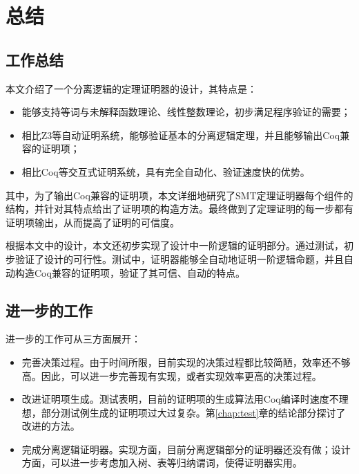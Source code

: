 \chapter{总结}
\label{chap:end}

\section{工作总结}
本文介绍了一个分离逻辑的定理证明器的设计，其特点是：
\begin{itemize}
  \item 能够支持等词与未解释函数理论、线性整数理论，初步满足程序验证的需要；
  \item 相比Z3等自动证明系统，能够验证基本的分离逻辑定理，并且能够输出Coq兼容的证明项；
  \item 相比Coq等交互式证明系统，具有完全自动化、验证速度快的优势。
\end{itemize}

其中，为了输出Coq兼容的证明项，本文详细地研究了SMT定理证明器每个组件的结构，并针对其特点给出了证明项的构造方法。最终做到了定理证明的每一步都有证明项输出，从而提高了证明的可信度。

根据本文中的设计，本文还初步实现了设计中一阶逻辑的证明部分。通过测试，初步验证了设计的可行性。测试中，证明器能够全自动地证明一阶逻辑命题，并且自动构造Coq兼容的证明项，验证了其可信、自动的特点。

\section{进一步的工作}
进一步的工作可从三方面展开：
\begin{itemize}
  \item 完善决策过程。由于时间所限，目前实现的决策过程都比较简陋，效率还不够高。因此，可以进一步完善现有实现，或者实现效率更高的决策过程。
  \item 改进证明项生成。测试表明，目前的证明项的生成算法用Coq编译时速度不理想，部分测试例生成的证明项过大过复杂。第\ref{chap:test}章的结论部分探讨了改进的方法。
  \item 完成分离逻辑证明器。实现方面，目前分离逻辑部分的证明器还没有做；设计方面，可以进一步考虑加入树、表等归纳谓词，使得证明器实用。
\end{itemize}


